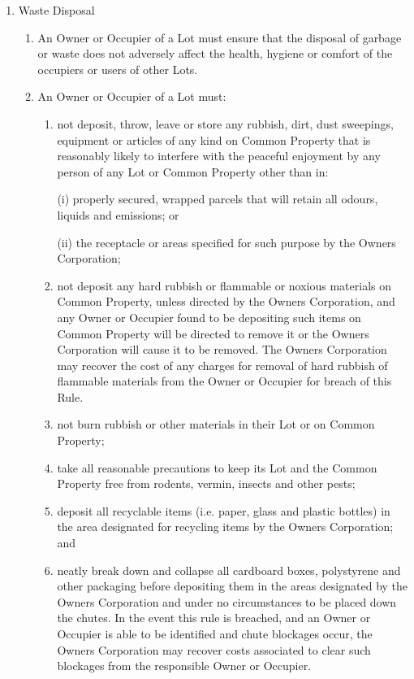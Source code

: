 \documentclass{article}
\begin{document}
\begin{enumerate}[label=\arabic*.]
\begin{enumerate}[label=\arabic{enumi}.\arabic*.]
\begin{enumerate}[label=(\arabic*)]
\end{enumerate}

\item  Waste Disposal

\begin{enumerate}[label=(\arabic*)]

\item  An Owner or Occupier of a Lot must ensure that the disposal of garbage or waste does not adversely affect the health, hygiene or comfort of the occupiers or users of other Lots.

\item  An Owner or Occupier of a Lot must:

\begin{enumerate}[label=(\alph*)]

\item  not deposit, throw, leave or store any rubbish, dirt, dust sweepings, equipment or articles of any kind on Common Property that is reasonably likely to interfere with the peaceful enjoyment by any person of any Lot or Common Property other than in:

(i) properly secured, wrapped parcels that will retain all odours, liquids and emissions; or

(ii) the receptacle or areas specified for such purpose by the Owners Corporation;

\item  not deposit any hard rubbish or flammable or noxious materials on Common Property, unless directed by the Owners Corporation, and any Owner or Occupier found to be depositing such items on Common Property will be directed to remove it or the Owners Corporation will cause it to be removed. The Owners Corporation may recover the cost of any charges for removal of hard rubbish of flammable materials from the Owner or Occupier for breach of this Rule.

\item  not burn rubbish or other materials in their Lot or on Common Property;

\item  take all reasonable precautions to keep its Lot and the Common Property free from rodents, vermin, insects and other pests;

\item  deposit all recyclable items (i.e. paper, glass and plastic bottles) in the area designated for recycling items by the Owners Corporation; and

\item  neatly break down and collapse all cardboard boxes, polystyrene and other packaging before depositing them in the areas designated by the Owners Corporation and under no circumstances to be placed down the chutes. In the event this rule is breached, and an Owner or Occupier is able to be identified and chute blockages occur, the Owners Corporation may recover costs associated to clear such blockages from the responsible Owner or Occupier.


\end{enumerate}
\end{enumerate}
\end{enumerate}
\end{enumerate}
\end{document}
